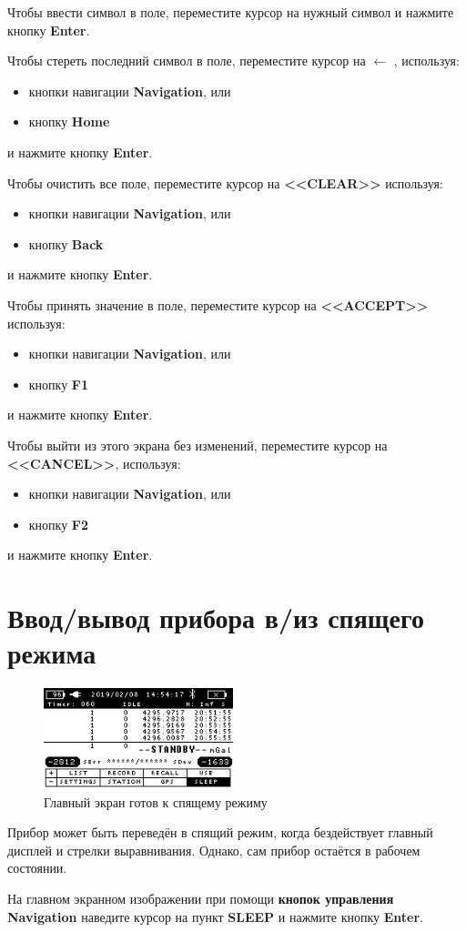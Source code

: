 Чтобы ввести символ в поле, переместите курсор на нужный символ и нажмите кнопку
\textbf{Enter}.

Чтобы стереть последний символ в поле, переместите курсор на $\leftarrow$ , используя:
\begin{itemize}
  \item кнопки навигации \textbf{Navigation}, или
  \item кнопку \textbf{Home}
\end{itemize}
и нажмите кнопку \textbf{Enter}.

Чтобы очистить все поле, переместите курсор на \textbf{<<CLEAR>>} используя:
\begin{itemize}
  \item кнопки навигации \textbf{Navigation}, или
  \item кнопку \textbf{Back}
\end{itemize}
и нажмите кнопку \textbf{Enter}.

Чтобы принять значение в поле, переместите курсор на \textbf{<<ACCEPT>>} используя:
\begin{itemize}
  \item кнопки навигации \textbf{Navigation}, или
  \item кнопку \textbf{F1}
\end{itemize}
и нажмите кнопку \textbf{Enter}.

Чтобы выйти из этого экрана без изменений, переместите курсор на
\textbf{<<CANCEL>>}, используя:
\begin{itemize}
  \item кнопки навигации \textbf{Navigation}, или
  \item кнопку \textbf{F2}
\end{itemize}
и нажмите кнопку \textbf{Enter}.

\section[Спящий режим]{Ввод/вывод прибора \cg{} в/из спящего режима}

\begin{figure}[hb]
  \centering
  \includegraphics[width=0.49\textwidth]{figures/the_main_screen_ready_for_sleep_mode}
  \caption{Главный экран готов к спящему режиму}
  \label{fig:the_main_screen_ready_for_sleep_mode}
\end{figure}

Прибор \cg{} может быть переведён в спящий режим, когда бездействует главный
дисплей и стрелки выравнивания. Однако, сам прибор остаётся в рабочем состоянии.

На главном экранном изображении при помощи \textbf{кнопок управления Navigation}
наведите курсор на пункт \textbf{SLEEP} и нажмите кнопку \textbf{Enter}.

